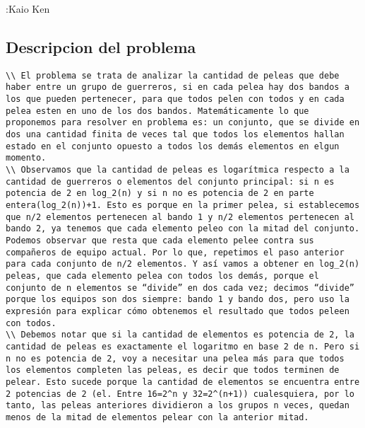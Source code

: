 \documentclass[10pt,a4paper]{article}
\begin{document}

\subtitle{Ejercicio 3}

:Kaio Ken
\subsection{Descripcion del problema}

\begin{verbatim}
\\ El problema se trata de analizar la cantidad de peleas que debe haber entre un grupo de guerreros, si en cada pelea hay dos bandos a los que pueden pertenecer, para que todos pelen con todos y en cada pelea esten en uno de los dos bandos. Matemáticamente lo que proponemos para resolver en problema es: un conjunto, que se divide en dos una cantidad finita de veces tal que todos los elementos hallan estado en el conjunto opuesto a todos los demás elementos en elgun momento.
\\ Observamos que la cantidad de peleas es logarítmica respecto a la cantidad de guerreros o elementos del conjunto principal: si n es potencia de 2 en log_2(n) y si n no es potencia de 2 en parte entera(log_2(n))+1. Esto es porque en la primer pelea, si establecemos que n/2 elementos pertenecen al bando 1 y n/2 elementos pertenecen al bando 2, ya tenemos que cada elemento peleo con la mitad del conjunto. Podemos observar que resta que cada elemento pelee contra sus compañeros de equipo actual. Por lo que, repetimos el paso anterior para cada conjunto de n/2 elementos. Y así vamos a obtener en log_2(n) peleas, que cada elemento pelea con todos los demás, porque el conjunto de n elementos se “divide” en dos cada vez; decimos “divide” porque los equipos son dos siempre: bando 1 y bando dos, pero uso la expresión para explicar cómo obtenemos el resultado que todos peleen con todos. 
\\ Debemos notar que si la cantidad de elementos es potencia de 2, la cantidad de peleas es exactamente el logaritmo en base 2 de n. Pero si n no es potencia de 2, voy a necesitar una pelea más para que todos los elementos completen las peleas, es decir que todos terminen de pelear. Esto sucede porque la cantidad de elementos se encuentra entre 2 potencias de 2 (el. Entre 16=2^n y 32=2^(n+1)) cualesquiera, por lo tanto, las peleas anteriores dividieron a los grupos n veces, quedan menos de la mitad de elementos pelear con la anterior mitad. 
\end{verbatim}
\end{document}
